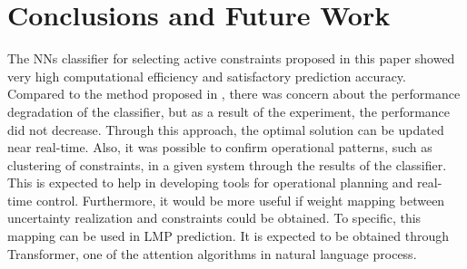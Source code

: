 \documentclass[11pt]{article}
\begin{document}
\section{Conclusions and Future Work }\label{sec:conclusions}
The NNs classifier for selecting active constraints proposed in this paper showed very high computational efficiency and satisfactory prediction accuracy. Compared to the method proposed in \cite{learning_dc_opf}, there was concern about the performance degradation of the classifier, but as a result of the experiment, the performance did not decrease.
Through this approach, the optimal solution can be updated near real-time. Also, it was possible to confirm operational patterns, such as clustering of constraints, in a given system through the results of the classifier. This is expected to help in developing tools for operational planning and real-time control. Furthermore, it would be more useful if weight mapping between uncertainty realization and constraints could be obtained. To specific, this mapping can be used in LMP prediction. It is expected to be obtained through Transformer\cite{transformer}, one of the attention algorithms in natural language process.

\end{document}
